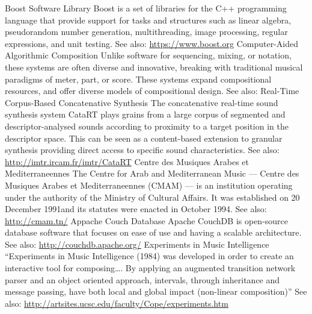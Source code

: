 	{Boost Software Library}
	{Boost is a set of libraries for the C++ programming language that provide support for tasks and structures such as linear algebra, pseudorandom number generation, multithreading, image processing, regular expressions, and unit testing. See also: \url{https://www.boost.org}}
	{Computer-Aided Algorithmic Composition}
	{Unlike software for sequencing, mixing, or notation, these systems are often diverse and innovative, breaking with traditional musical paradigms of meter, part, or score. These systems expand compositional resources, and offer diverse models of compositional design. See also: \url{} \parencite[1]{Ari05:Ano}}
	{Real-Time Corpus-Based Concatenative Synthesis}
	{The concatenative real-time sound synthesis system CataRT plays grains from a large corpus of segmented and descriptor-analysed sounds according to proximity to a target position in the descriptor space. This can be seen as a content-based extension to granular synthesis providing direct access to specific sound characteristics. See also: \url{http://imtr.ircam.fr/imtr/CataRT}}
	{Centre des Musiques Arabes et Mediterraneennes}
	{The Centre for Arab and Mediterranean Music --- Centre des Musiques Arabes et Mediterraneennes (CMAM) --- is an institution operating under the authority of the Ministry of Cultural Affairs. It was established on 20 December 1991and its statutes were enacted in October 1994. See also: \url{http://cmam.tn/}}
	{Appache Couch Database}
	{Apache CouchDB is open-source database software that focuses on ease of use and having a scalable architecture. See also: \url{http://couchdb.apache.org/}}
	{Experiments in Music Intelligence}
	{``Experiments in Music Intelligence (1984) was developed in order to create an interactive tool for composing\dots. By applying an augmented transition network parser and an object oriented approach, intervals, through inheritance and message passing, have both local and global impact (non-linear composition)'' See also: \url{http://artsites.ucsc.edu/faculty/Cope/experiments.htm}  \parencite{DBLP:conf/icmc/Cope87}}
